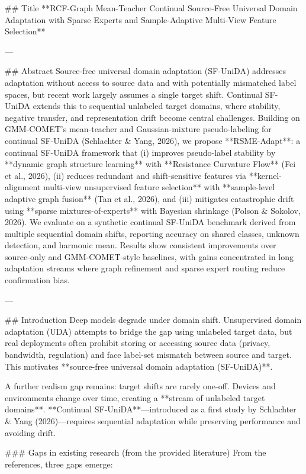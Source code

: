 ## Title  
**RCF-Graph Mean-Teacher Continual Source-Free Universal Domain Adaptation with Sparse Experts and Sample-Adaptive Multi-View Feature Selection**

---

## Abstract  
Source-free universal domain adaptation (SF-UniDA) addresses adaptation without access to source data and with potentially mismatched label spaces, but recent work largely assumes a single target shift. Continual SF-UniDA extends this to sequential unlabeled target domains, where stability, negative transfer, and representation drift become central challenges. Building on GMM-COMET’s mean-teacher and Gaussian-mixture pseudo-labeling for continual SF-UniDA (Schlachter & Yang, 2026), we propose **RSME-Adapt**: a continual SF-UniDA framework that (i) improves pseudo-label stability by **dynamic graph structure learning** with **Resistance Curvature Flow** (Fei et al., 2026), (ii) reduces redundant and shift-sensitive features via **kernel-alignment multi-view unsupervised feature selection** with **sample-level adaptive graph fusion** (Tan et al., 2026), and (iii) mitigates catastrophic drift using **sparse mixtures-of-experts** with Bayesian shrinkage (Polson & Sokolov, 2026). We evaluate on a synthetic continual SF-UniDA benchmark derived from multiple sequential domain shifts, reporting accuracy on shared classes, unknown detection, and harmonic mean. Results show consistent improvements over source-only and GMM-COMET-style baselines, with gains concentrated in long adaptation streams where graph refinement and sparse expert routing reduce confirmation bias.  

---

## Introduction  
Deep models degrade under domain shift. Unsupervised domain adaptation (UDA) attempts to bridge the gap using unlabeled target data, but real deployments often prohibit storing or accessing source data (privacy, bandwidth, regulation) and face label-set mismatch between source and target. This motivates **source-free universal domain adaptation (SF-UniDA)**.  

A further realism gap remains: target shifts are rarely one-off. Devices and environments change over time, creating a **stream of unlabeled target domains**. **Continual SF-UniDA**—introduced as a first study by Schlachter & Yang (2026)—requires sequential adaptation while preserving performance and avoiding drift.

### Gaps in existing research (from the provided literature)
From the references, three gaps emerge:

